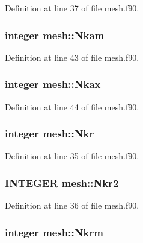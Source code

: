 Definition at line 37 of file mesh.f90.

\hypertarget{namespacemesh_a910970a3de4d93dbe22c5990a246c360}{
\subsubsection[{Nkam}]{\setlength{\rightskip}{0pt plus 5cm}integer {\bf mesh::Nkam}}}
\label{namespacemesh_a910970a3de4d93dbe22c5990a246c360}


Definition at line 43 of file mesh.f90.

\hypertarget{namespacemesh_a29b4b004a2f1961e2ad6ea8faf2bc447}{
\subsubsection[{Nkax}]{\setlength{\rightskip}{0pt plus 5cm}integer {\bf mesh::Nkax}}}
\label{namespacemesh_a29b4b004a2f1961e2ad6ea8faf2bc447}


Definition at line 44 of file mesh.f90.

\hypertarget{namespacemesh_a1d27552200f5f3bf302bcbd55bb2ccf5}{
\subsubsection[{Nkr}]{\setlength{\rightskip}{0pt plus 5cm}integer {\bf mesh::Nkr}}}
\label{namespacemesh_a1d27552200f5f3bf302bcbd55bb2ccf5}


Definition at line 35 of file mesh.f90.

\hypertarget{namespacemesh_a55a4e9bc46503b5f1fddde6e621a0b86}{
\subsubsection[{Nkr2}]{\setlength{\rightskip}{0pt plus 5cm}INTEGER {\bf mesh::Nkr2}}}
\label{namespacemesh_a55a4e9bc46503b5f1fddde6e621a0b86}


Definition at line 36 of file mesh.f90.

\hypertarget{namespacemesh_ac39a727e6167a944fb3c7997bfd11de4}{
\subsubsection[{Nkrm}]{\setlength{\rightskip}{0pt plus 5cm}integer {\bf mesh::Nkrm}}}
\label{namespacemesh_ac39a727e6167a944fb3c7997bfd11de4}


